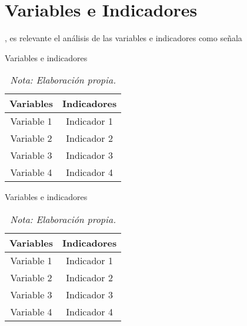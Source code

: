 	\chapter{Variables e Indicadores}\label{Cap: Variables e Indicadores}
		\lipsum[17], es relevante el análisis de las variables e indicadores como señala \cite{Carter-1958}
		\begin{table}[h!]
			\raggedright
			\caption{Variables e indicadores}
			\begin{tabular}{cc}
				\toprule
				Variables & Indicadores \\
				\midrule
				Variable 1 & Indicador 1\\
				Variable 2 & Indicador 2\\
				Variable 3 & Indicador 3\\
				Variable 4 & Indicador 4\\
				\bottomrule
			\end{tabular}
			\vspace{2mm}
			\caption*{\it Nota: Elaboración propia.}
			\label{tab: Variables e indicadores 1}
		\end{table}
		\lipsum[1-3]
		\begin{table}[h!]
			\raggedright
			\caption{Variables e indicadores}
			\begin{tabular}{cc}
				\toprule
				Variables & Indicadores \\
				\midrule
				Variable 1 & Indicador 1\\
				Variable 2 & Indicador 2\\
				Variable 3 & Indicador 3\\
				Variable 4 & Indicador 4\\
				\bottomrule
			\end{tabular}
			\vspace{2mm}
			\caption*{\it Nota: Elaboración propia.}
			\label{tab: Variables e indicadores 2}
		\end{table}
		